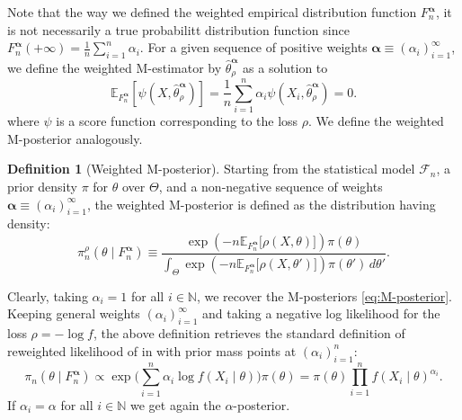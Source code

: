 \documentclass[11pt, oneside]{amsart}
\theoremstyle{definition}   %
\newtheorem{definition}{Definition}
\newcommand{\E}{\mathbb{E}}
\newcommand{\loss}{\rho}
\newcommand{\wempirical}{F_n^{\boldsymbol{\alpha}}}
\begin{document}
Note that the way we defined the weighted empirical distribution function \( \wempirical \), it is not necessarily a true probabilitt distribution function since \( \wempirical(+ \infty) = \tfrac{1}{n} \sum_{i=1}^n \alpha_i\). 
For a given sequence of positive weights \( \boldsymbol{\alpha} \equiv (\alpha_i)_{i = 1}^{\infty}\), we define the weighted M-estimator by \( \hat{\theta}^{\boldsymbol{\alpha}}_{\loss} \) as a solution to
%
\[
\mathbb{E}_{\wempirical}[\psi(X,\hat{\theta}^{\boldsymbol{\alpha}}_{\loss} )]=\frac{1}{n}\sum_{i=1}^n \alpha_i \psi(X_i, \hat{\theta}^{\boldsymbol{\alpha}}_{\loss} ) = 0.
\]
%
where \( \psi \) is a score function corresponding to the loss \( \loss \).
%
We define the weighted M-posterior analogously.
%
\begin{definition}[Weighted M-posterior]
    Starting from the statistical model \( \mathcal{F}_n \), a prior density \( \pi \) for \( \theta \) over \( \Theta \), and a non-negative sequence of weights \( \boldsymbol{\alpha} \equiv (\alpha_i)_{i = 1}^{\infty}\), the weighted M-posterior is defined as the distribution having density:
    \begin{equation}
        \label{def::weighted-M-posterior}
        \pi^\loss_{n}(\theta \mid \wempirical) \equiv \frac{\exp \left ( -n\E_{\wempirical} \bigl [ \loss(X, \theta) \bigr ] \right ) \pi(\theta)}{\int_{\Theta} \exp \left ( -n\E_{\wempirical} \bigl [ \loss(X, \theta') \bigr ] \right )  \pi(\theta') \, d\theta'}.
    \end{equation}
\end{definition}
%
Clearly, taking $\alpha_i=1$ for all $i\in\mathbb{N}$, we recover the M-posteriors \eqref{eq:M-posterior}. Keeping general weights $(\alpha_i)_{i=1}^\infty$ and taking a negative log likelihood for the loss \( \loss = -\log f \), the above definition retrieves the standard definition of reweighted likelihood of \citep{wang:kucukelbir:blei2017} in  with prior mass points at $(\alpha_i)_{i=1}^n$:
%
\[
\pi_{n}(\theta \mid \wempirical) \propto \exp \Big ( \sum_{i=1}^n \alpha_i \log f(X_i \mid \theta) \Big ) \pi(\theta) = \pi(\theta) \prod_{i=1}^n f(X_i \mid \theta)^{\alpha_i} .
\]
%
If $\alpha_i=\alpha$ for all $i\in\mathbb{N}$ we get again the $\alpha$-posterior.
%
\end{document}
